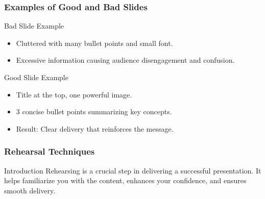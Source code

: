 \documentclass[aspectratio=169]{beamer}
\begin{document}
\begin{frame}[fragile]
    \frametitle{Examples of Good and Bad Slides}
    \begin{block}{Bad Slide Example}
        \begin{itemize}
            \item Cluttered with many bullet points and small font.
            \item Excessive information causing audience disengagement and confusion.
        \end{itemize}
    \end{block}

    \begin{block}{Good Slide Example}
        \begin{itemize}
            \item Title at the top, one powerful image.
            \item 3 concise bullet points summarizing key concepts.
            \item Result: Clear delivery that reinforces the message.
        \end{itemize}
    \end{block}
\end{frame}

\begin{frame}[fragile]
    \frametitle{Rehearsal Techniques}
    \begin{block}{Introduction}
        Rehearsing is a crucial step in delivering a successful presentation. 
        It helps familiarize you with the content, enhances your confidence, and ensures smooth delivery.
    \end{block}
\end{frame}
\end{document}

